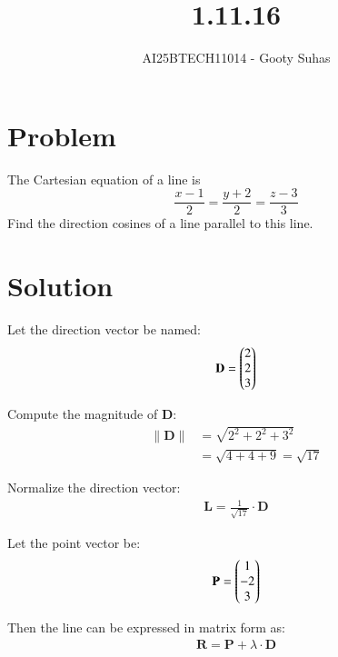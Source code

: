 \documentclass[journal]{IEEEtran}
\begin{document}

\vspace{3cm}

\title{1.11.16}
\author{AI25BTECH11014 - Gooty Suhas}
{\let\newpage\relax\maketitle}

\renewcommand{\thefigure}{\theenumi}
\renewcommand{\thetable}{\theenumi}
\setlength{\intextsep}{10pt}
\renewcommand{\thetable}{\theenumi}

\section*{\large\textbf{Problem}}
\vspace{0.5cm}

The Cartesian equation of a line is  
\[
\frac{x - 1}{2} = \frac{y + 2}{2} = \frac{z - 3}{3}
\]  
Find the direction cosines of a line parallel to this line.

\section*{\large\textbf{Solution}}
\vspace{0.5cm}

Let the direction vector be named:
\begin{align}
\mathbf{D} = \begin{pmatrix}2\\2\\3\end{pmatrix}
\end{align}

Compute the magnitude of \(\mathbf{D}\):
\begin{align}
\|\mathbf{D}\| &= \sqrt{2^2 + 2^2 + 3^2} \\
&= \sqrt{4 + 4 + 9} = \sqrt{17}
\end{align}

Normalize the direction vector:
\begin{align}
\mathbf{L} = \frac{1}{\sqrt{17}} \cdot \mathbf{D}
\end{align}

Let the point vector be:
\begin{align}
\mathbf{P} = \begin{pmatrix}1\\-2\\3\end{pmatrix}
\end{align}

Then the line can be expressed in matrix form as:
\begin{align}
\mathbf{R} = \mathbf{P} + \lambda \cdot \mathbf{D}
\end{align}
\end{document}
